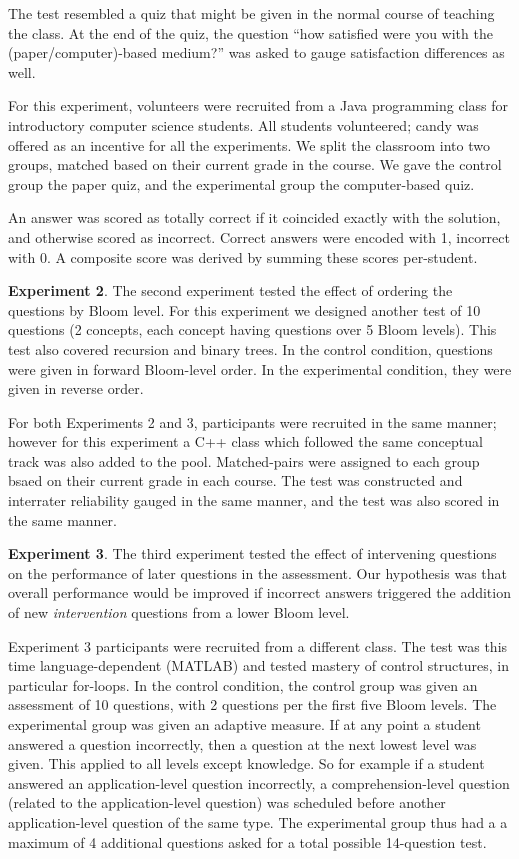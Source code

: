 The test resembled a quiz that might be given in the normal course of teaching
the class. At the end of the quiz, the question ``how satisfied were you with
the (paper/computer)-based medium?'' was asked to gauge satisfaction
differences as well.

For this experiment, volunteers were recruited from a Java programming class
for introductory computer science students.  All students volunteered; candy
was offered as an incentive for all the experiments.  We split the classroom
into two groups, matched based on their current grade in the course.  We gave
the control group the paper quiz, and the experimental group the computer-based
quiz.

An answer was scored as totally correct if it coincided exactly with the
solution, and otherwise scored as incorrect. Correct answers were encoded with
1, incorrect with 0.  A composite score was derived by summing these scores
per-student.

\textbf{Experiment 2}.  The second experiment tested the effect of ordering the
questions by Bloom level.  For this experiment we designed another test of 10
questions (2 concepts, each concept having questions over 5 Bloom levels).
This test also covered recursion and binary trees. In the control condition,
questions were given in forward Bloom-level order.  In the experimental
condition, they were given in reverse order.

For both Experiments 2 and 3, participants were recruited in the same manner;
however for this experiment a C++ class which followed the same conceptual
track was also added to the pool. Matched-pairs were assigned to each group
bsaed on their current grade in each course.  The test was constructed and
interrater reliability gauged in the same manner, and the test was also scored
in the same manner.

\textbf{Experiment 3}. The third experiment tested the effect of intervening
questions on the performance of later questions in the assessment.  Our
hypothesis was that overall performance would be improved if incorrect answers
triggered the addition of new {\em intervention} questions from a lower Bloom
level.

Experiment 3 participants were recruited from a different class. The test was
this time language-dependent (MATLAB) and tested mastery of control structures,
in particular for-loops.  In the control condition, the control group was given
an assessment of 10 questions, with 2 questions per the first five Bloom
levels. The experimental group was given an adaptive measure.  If at any point
a student answered a question incorrectly, then a question at the next lowest
level was given.  This applied to all levels except knowledge.  So for example
if a student answered an application-level question incorrectly, a
comprehension-level question (related to the application-level question) was
scheduled before another application-level question of the same type.  The
experimental group thus had a a maximum of 4 additional questions asked for a
total possible 14-question test.


